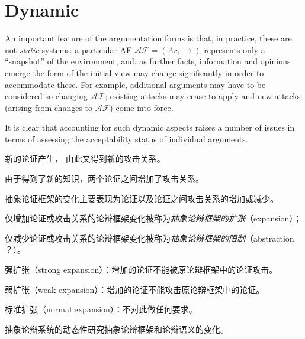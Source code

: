 
\section{Dynamic}

An important feature of the argumentation forms is that, in practice, these are not \textit{static} systems:
% 
a particular AF $\mathcal{AF}=(Ar,\to)$ 
represents only a  ``snapshot'' of the environment, 
and, as further facts, 
information and opinions emerge the form of the initial view may change significantly in order to accommodate these. 
For example, 
additional arguments may have to be considered so changing $\mathcal{AF}$; 
existing attacks may cease to apply and new attacks (arising from changes to $\mathcal{AF}$) come into force.


It is clear that accounting for such dynamic aspects raises a number of issues in terms of assessing the acceptability status of individual arguments.




新的论证产生， 由此又得到新的攻击关系。

由于得到了新的知识，两个论证之间增加了攻击关系。


\vspace{2em}

抽象论证框架的变化主要表现为论证以及论证之间攻击关系的增加或减少。

仅增加论证或攻击关系的论辩框架变化被称为\textit{抽象论辩框架的扩张}（expansion）；

仅减少论证或攻击关系的论辩框架变化被称为\textit{抽象论辩框架的限制}（abstraction ？）。

\vspace{1em}



强扩张（strong expansion）：增加的论证不能被原论辩框架中的论证攻击。

弱扩张（weak expansion）：增加的论证不能攻击原论辩框架中的论证。

标准扩张（normal expansion）：不对此做任何要求。



\vspace{3em}

抽象论辩系统的动态性研究抽象论辩框架和论辩语义的变化。

